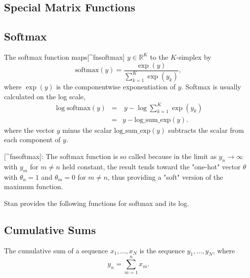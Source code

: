 \begin{description}
{\begin{description}
\section{Special Matrix Functions}\label{softmax.section}


\subsection{Softmax}


The softmax function maps[^fnsoftmax] $y \in \mathbb{R}^K$ to the $K$-simplex by \[ \text{softmax}(y)  = \frac{\exp(y)}         {\sum_{k=1}^K \exp(y_k)}, \] where $\exp(y)$ is the componentwise exponentiation of $y$. Softmax is usually calculated on the log scale, \begin{eqnarray*} \log \text{softmax}(y) & = & \ y - \log \sum_{k=1}^K \exp(y_k) \\[4pt] & = & y - \text{log_sum_exp}(y). \end{eqnarray*} where the vector $y$ minus the scalar $\text{log_sum_exp}(y)$ subtracts the scalar from each component of $y$.

[^fnsoftmax]: The softmax function is so called because in the limit as   $y_n \rightarrow \infty$ with $y_m$ for $m \neq n$ held constant,   the result tends toward the "one-hot" vector $\theta$ with   $\theta_n = 1$ and $\theta_m = 0$ for $m \neq n$, thus providing a   "soft" version of the maximum function.

Stan provides the following functions for softmax and its log.

\begin{description}   \end{description}

\subsection{Cumulative Sums}

The cumulative sum of a sequence $x_1,\ldots,x_N$ is the sequence $y_1,\ldots,y_N$, where \[ y_n = \sum_{m = 1}^{n} x_m. \] 

\begin{description}    \end{description}



\end{description}}
\end{description}
